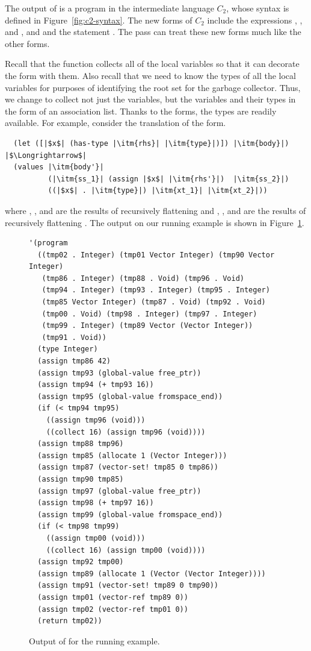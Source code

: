 \documentclass[11pt]{book}
\begin{document}
The output of  is a program in the intermediate language
$C_2$, whose syntax is defined in Figure~\ref{fig:c2-syntax}.  The new
forms of $C_2$ include the expressions ,
, and , and  and
the statement .  The  pass can treat these
new forms much like the other forms.

Recall that the  function collects all of the local
variables so that it can decorate the  form with
them. Also recall that we need to know the types of all the local
variables for purposes of identifying the root set for the garbage
collector.  Thus, we change  to collect not just the
variables, but the variables and their types in the form of an
association list.  Thanks to the  forms, the types are
readily available.  For example, consider the translation of the
 form.
\begin{lstlisting}
  (let ([|$x$| (has-type |\itm{rhs}| |\itm{type}|)]) |\itm{body}|)
|$\Longrightarrow$|
  (values |\itm{body'}|
          (|\itm{ss_1}| (assign |$x$| |\itm{rhs'}|)  |\itm{ss_2}|)
          ((|$x$| . |\itm{type}|) |\itm{xt_1}| |\itm{xt_2}|))
\end{lstlisting}
where , , and  are the results of
recursively flattening  and , , and
 are the results of recursively flattening .  The
output on our running example is shown in Figure~\ref{fig:flatten-gc}.

\begin{figure}[tbp]
\begin{lstlisting}
'(program
  ((tmp02 . Integer) (tmp01 Vector Integer) (tmp90 Vector Integer)
   (tmp86 . Integer) (tmp88 . Void) (tmp96 . Void)
   (tmp94 . Integer) (tmp93 . Integer) (tmp95 . Integer)
   (tmp85 Vector Integer) (tmp87 . Void) (tmp92 . Void)
   (tmp00 . Void) (tmp98 . Integer) (tmp97 . Integer)
   (tmp99 . Integer) (tmp89 Vector (Vector Integer))
   (tmp91 . Void))
  (type Integer)
  (assign tmp86 42)
  (assign tmp93 (global-value free_ptr))
  (assign tmp94 (+ tmp93 16))
  (assign tmp95 (global-value fromspace_end))
  (if (< tmp94 tmp95)
    ((assign tmp96 (void)))
    ((collect 16) (assign tmp96 (void))))
  (assign tmp88 tmp96)
  (assign tmp85 (allocate 1 (Vector Integer)))
  (assign tmp87 (vector-set! tmp85 0 tmp86))
  (assign tmp90 tmp85)
  (assign tmp97 (global-value free_ptr))
  (assign tmp98 (+ tmp97 16))
  (assign tmp99 (global-value fromspace_end))
  (if (< tmp98 tmp99)
    ((assign tmp00 (void)))
    ((collect 16) (assign tmp00 (void))))
  (assign tmp92 tmp00)
  (assign tmp89 (allocate 1 (Vector (Vector Integer))))
  (assign tmp91 (vector-set! tmp89 0 tmp90))
  (assign tmp01 (vector-ref tmp89 0))
  (assign tmp02 (vector-ref tmp01 0))
  (return tmp02))
\end{lstlisting}
\caption{Output of  for the running example.}
\label{fig:flatten-gc}
\end{figure}
\end{document}

